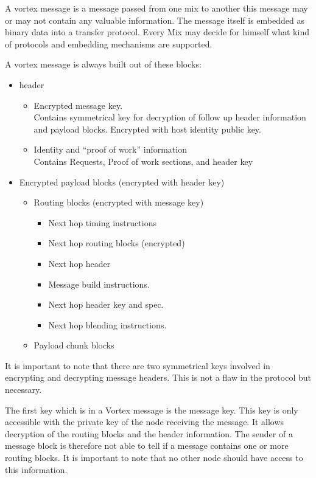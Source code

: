 A vortex message is a message passed from one mix to another this message may or may not contain any valuable information. The message itself is embedded as binary data into a transfer protocol. Every Mix may decide for himself what kind of protocols and embedding mechanisms are supported.

A vortex message is always built out of these blocks:
\begin{itemize}
	\item header
	\begin{itemize}
		\item Encrypted message key.\\
			  Contains symmetrical key for decryption of follow up header information and payload blocks. Encrypted with host identity public key.
		\item Identity and ``proof of work'' information\\
		      Contains Requests, Proof of work sections, and header key
	\end{itemize}
	\item Encrypted payload blocks (encrypted with header key)
	\begin{itemize}
		\item Routing blocks (encrypted with message key)
		\begin{itemize}
			\item Next hop timing instructions
			\item Next hop routing blocks (encrypted)
			\item Next hop header
			\item Message build instructions.
			\item Next hop header key and spec.
			\item Next hop blending instructions.
		\end{itemize}
		\item Payload chunk blocks
	\end{itemize}
\end{itemize}

It is important to note that there are two symmetrical keys involved in encrypting and decrypting message headers. This is not a flaw in the protocol but necessary. 

The first key which is in a Vortex message is the message key. This key is only accessible with the private key of the node receiving the message. It allows decryption of the routing blocks and the header information. The sender of a message block is therefore not able to tell if a message contains one or more routing blocks. It is important to note that no other node should have access to this information. 

